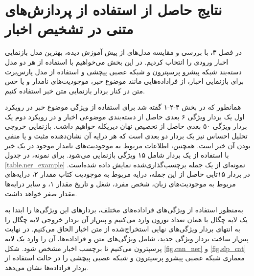 \section{نتایج حاصل از استفاده از پردازش‌های متنی در تشخیص اخبار}
در فصل ۳، با بررسی و مقایسه مدل‌های از پیش آموزش دیده، بهترین مدل بازنمایی اخبار ورودی را انتخاب کردیم. در این بخش می‌خواهیم با استفاده از هر دو مدل دسته‌بند شبکه پیشرو پرسپترون و شبکه عصبی پیچشی و استفاده از مدل پارس‌برت برای بازنمایی اخبار، از فراداده‌هایی مانند موضوع خبر، موجودیت‌های نامدار و یا حس متن در کنار بردار بازنمایی متن خبر استفاده کنیم.

همانطور که در بخش ۴-۲-۱ گفته شد برای استفاده از ویژگی موضوع خبر در رویکرد اول  یک بردار ویژگی ۶ بعدی حاصل از دسته‌بندی موضوعی اخبار و در رویکرد دوم یک بردار ویژگی ۵۰ بعدی حاصل از تخصیص نهان دیریکله خواهیم داشت. بازنمایی خروجی تحلیل احساس نیز یک بردار دو بعدی است که هر درایه آن نشان‌دهنده مثبت و یا منفی بودن آن خبر است. همچنین، اطلاعات مربوط به موجودیت‌های نامدار موجود در یک خبر با استفاده از یک بردار شامل ۱۵ ویژگی بازنمایی می‌شود. برای نمونه،  در جدول \ref{table.ner_example} نمونه‌ای از یک جمله برچسب‌گذاری‌شده نمایش داده شده‌است. در بردار ۱۵تایی حاصل از این جمله، درایه مربوط به موجودیت کتاب مقدار ۲، درایه‌های مربوط به موجودیت‌های زبان، شخص مفرد، شغل و تاریخ مقدار ۱، و سایر درایه‌ها مقدار صفر خواهد داشت. 



به‌منظور استفاده از ویژگی‌های فراداده‌های مختلف،  بردار‌های این ویژگی‌ها را ابتدا به یک لایه چگال با همان تعداد نورون وارد می‌کنیم و پس‌از‌ آن بردار خروجی لایه چگال را به انتهای بردار ویژگی‌های نهایی استخراج‌شده از متن اخبار الحاق می‌کنیم. در نهایت پس‌از ساخت بردار ویژگی جدید، شامل ویژگی‌های متن و فراداده‌ها، آن را وارد یک لایه پرسپترون می‌کنیم تا برچسب اخبار مشخص شود. شکل \ref{fig.cnn_ner} و \ref{fig.slp_cat} معماری شبکه عصبی پیشرو پرسپترون و شبکه عصبی پیچشی را در حالت استفاده از بردار فراداده‌ها  نشان می‌دهد. 

